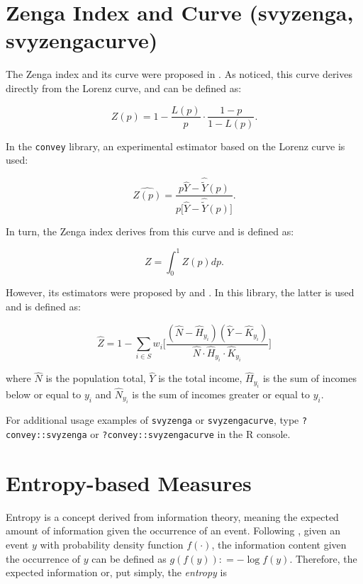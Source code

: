 \documentclass[]{book}
\begin{document}
\section{Zenga Index and Curve (svyzenga,
svyzengacurve)}\label{zenga-index-and-curve-svyzenga-svyzengacurve}

The Zenga index and its curve were proposed in \citep{zenga2007}. As
\citep{polisicchio2011} noticed, this curve derives directly from the
Lorenz curve, and can be defined as:

\[
Z(p) = 1 - \frac{L(p)}{p} \cdot \frac{1 - p}{1 - L(p)}.
\]

In the \texttt{convey} library, an experimental estimator based on the
Lorenz curve is used:

\[
\widehat{Z(p)} = \frac{ p \widehat{Y} - \widehat{\widetilde{Y}}(p) }{p \big[ \widehat{Y} - \widehat{\widetilde{Y}}(p) \big] }.
\]

In turn, the Zenga index derives from this curve and is defined as:

\[
Z = \int_0^1 Z(p)dp.
\]

However, its estimators were proposed by \citep{langel2012} and
\citep{barabesi2016}. In this library, the latter is used and is defined
as:

\[
\widehat{Z} = 1 - \sum_{i \in S} w_i \bigg[ \frac{ ( \widehat{N} - \widehat{H}_{y_i} ) ( \widehat{Y} -\widehat{K}_{y_i} ) }
{ \widehat{N} \cdot \widehat{H}_{y_i} \cdot \widehat{K}_{y_i} } \bigg]
\]

where \(\widehat{N}\) is the population total, \(\widehat{Y}\) is the
total income, \(\widehat{H}_{y_i}\) is the sum of incomes below or equal
to \(y_i\) and \(\widehat{N}_{y_i}\) is the sum of incomes greater or
equal to \(y_i\).

For additional usage examples of \texttt{svyzenga} or
\texttt{svyzengacurve}, type \texttt{?convey::svyzenga} or
\texttt{?convey::svyzengacurve} in the R console.

\section{Entropy-based Measures}\label{entropy-based-measures}

Entropy is a concept derived from information theory, meaning the
expected amount of information given the occurrence of an event.
Following \citep{shannon1948}, given an event \(y\) with probability
density function \(f(\cdot)\), the information content given the
occurrence of \(y\) can be defined as \(g(f(y)) \colon= - \log f(y)\).
Therefore, the expected information or, put simply, the \emph{entropy}
is
\end{document}
